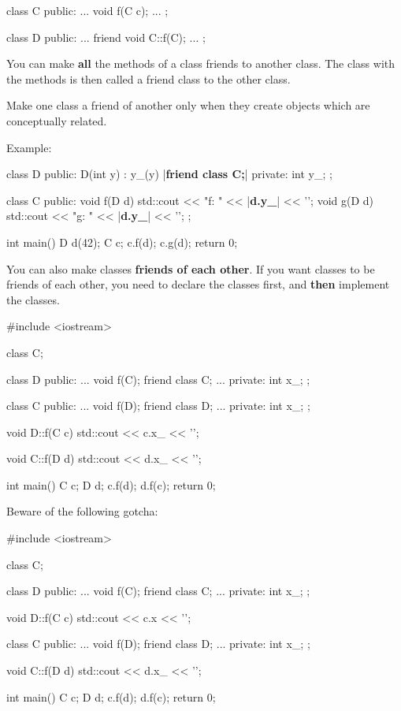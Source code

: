 \begin{consolethree}[escapeinside=||]
class C
{
public:
    ...
    void f(C c);
    ...
};

class D
{
public:
    ...
    friend void C::f(C);
    ...
};
\end{consolethree}


\newpage{}

You can make \textbf{all} the methods of a class friends to another
class. The class with the methods is then called a friend class to the
other class.

Make one class a friend of another only when they create objects which
are conceptually related.

Example:

\begin{consolethree}[escapeinside=||]
class D
{
public:
    D(int y)
        : y_(y)
    {}
    |{\bf friend class C;}|
private:
    int y_;
};

class C
{
public:
    void f(D d)
    {
        std::cout << "f: " << |{\bf d.y\_}| << '\n';
    }
    void g(D d)
    {
        std::cout << "g: " << |{\bf d.y\_}| << '\n';
    }
};

int main()
{
    D d(42);
    C c;
    c.f(d);
    c.g(d);
    return 0;
}
\end{consolethree}

You can also make classes \textbf{friends of each other}. If you want
classes to be friends of each other, you need to declare the classes
first, and \textbf{then} implement the classes.

\begin{consolethree}[escapeinside=||]
#include <iostream>

class C;

class D
{
public:
    ...
    void f(C);
    friend class C;
    ...
private:
    int x_;
};

class C
{
public:
    ...
    void f(D);
    friend class D;
    ...
private:
    int x_;
};

void D::f(C c)
{
    std::cout << c.x_ << '\n';
}

void C::f(D d)
{
    std::cout << d.x_ << '\n';
}

int main()
{
    C c;
    D d;
    c.f(d);
    d.f(c);
    return 0;
}
\end{consolethree}

Beware of the following gotcha:

\begin{consolethree}[escapeinside=||]
#include <iostream>

class C;

class D
{
public:
    ...
    void f(C);
    friend class C;
    ...
private:
    int x_;
};

void D::f(C c)
{
    std::cout << c.x << '\n';
}

class C
{
public:
    ...
    void f(D);
    friend class D;
    ...
private:
    int x_;
};

void C::f(D d)
{
    std::cout << d.x_ << '\n';
}

int main()
{
    C c;
    D d;
    c.f(d);
    d.f(c);
    return 0;
}
\end{consolethree}

